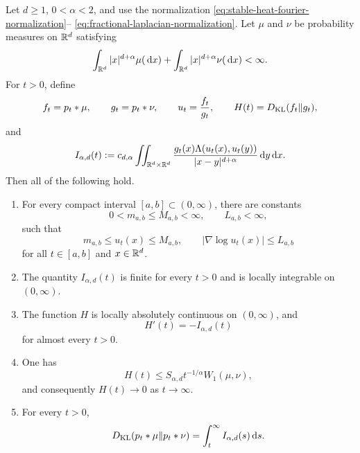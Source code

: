 \begin{theorem}
\label{thm:two-stable-heat-flow-relative-entropy}
Let \(d\ge1\), \(0<\alpha<2\), and use the normalization
\eqref{eq:stable-heat-fourier-normalization}--
\eqref{eq:fractional-laplacian-normalization}.  Let \(\mu\) and \(\nu\) be
probability measures on \(\mathbb{R}^d\) satisfying
\begin{equation}\label{eq:stable-flow-moment-hypothesis}
 \int_{\mathbb{R}^d}|x|^{d+\alpha}\mu(\,\mathrm{d} x)
 +\int_{\mathbb{R}^d}|x|^{d+\alpha}\nu(\,\mathrm{d} x)<\infty.
\end{equation}
For \(t>0\), define
\[
 f_t=p_t*\mu,\qquad g_t=p_t*\nu,\qquad
 u_t=\frac{f_t}{g_t},\qquad
 H(t)=D_{\rm KL}(f_t\|g_t),
\]
and
\begin{equation}\label{eq:stable-flow-dissipation-definition}
 I_{\alpha,d}(t):=c_{d,\alpha}
 \iint_{\mathbb{R}^d\times\mathbb{R}^d}
 \frac{g_t(x)\Lambda(u_t(x),u_t(y))}{|x-y|^{d+\alpha}}
 \,\mathrm{d} y\,\mathrm{d} x.
\end{equation}
Then all of the following hold.

\begin{enumerate}[label=\textup{(\roman*)}]
\item For every compact interval \([a,b]\subset(0,\infty)\), there are
constants
\[
 0<m_{a,b}\le M_{a,b}<\infty,\qquad L_{a,b}<\infty,
\]
such that
\begin{equation}\label{eq:stable-flow-compact-window-domain}
 m_{a,b}\le u_t(x)\le M_{a,b},\qquad
 |\nabla\log u_t(x)|\le L_{a,b}
\end{equation}
for all \(t\in[a,b]\) and \(x\in\mathbb{R}^d\).

\item The quantity \(I_{\alpha,d}(t)\) is finite for every \(t>0\) and is
locally integrable on \((0,\infty)\).

\item The function \(H\) is locally absolutely continuous on
\((0,\infty)\), and
\begin{equation}\label{eq:stable-flow-debruijn-identity}
 H'(t)=-I_{\alpha,d}(t)
\end{equation}
for almost every \(t>0\).

\item One has
\begin{equation}\label{eq:stable-flow-w1-decay}
 H(t)\le S_{\alpha,d}t^{-1/\alpha}W_1(\mu,\nu),
\end{equation}
and consequently \(H(t)\to0\) as \(t\to\infty\).

\item For every \(t>0\),
\begin{equation}\label{eq:stable-flow-tail-integral}
 D_{\rm KL}(p_t*\mu\|p_t*\nu)
 =\int_t^\infty I_{\alpha,d}(s)\,\mathrm{d} s.
\end{equation}


\end{enumerate}
\end{theorem}
